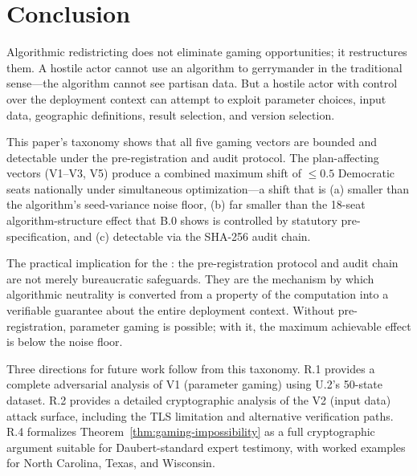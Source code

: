 \section{Conclusion}
\label{sec:conclusion}

Algorithmic redistricting does not eliminate gaming opportunities;
it restructures them.
A hostile actor cannot use an algorithm to gerrymander in the traditional
sense---the algorithm cannot see partisan data.
But a hostile actor with control over the deployment context can attempt to
exploit parameter choices, input data, geographic definitions, result selection,
and version selection.

This paper's taxonomy shows that all five gaming vectors are bounded and
detectable under the \dia{} pre-registration and audit protocol.
The plan-affecting vectors (V1--V3, V5) produce a combined maximum shift
of $\leq 0.5$ Democratic seats nationally under simultaneous optimization---a
shift that is (a) smaller than the algorithm's seed-variance noise floor,
(b) far smaller than the 18-seat algorithm-structure effect that B.0 shows
is controlled by statutory pre-specification, and (c) detectable via the
SHA-256 audit chain.

The practical implication for the \dia{}: the pre-registration protocol and
audit chain are not merely bureaucratic safeguards.
They are the mechanism by which algorithmic neutrality is converted from
a property of the computation into a verifiable guarantee about the entire
deployment context.
Without pre-registration, parameter gaming is possible; with it, the
maximum achievable effect is below the noise floor.

Three directions for future work follow from this taxonomy.
R.1 provides a complete adversarial analysis of V1 (parameter gaming)
using U.2's 50-state dataset.
R.2 provides a detailed cryptographic analysis of the V2 (input data)
attack surface, including the TLS limitation and alternative verification paths.
R.4 formalizes Theorem~\ref{thm:gaming-impossibility} as a full
cryptographic argument suitable for Daubert-standard expert testimony,
with worked examples for North Carolina, Texas, and Wisconsin.
